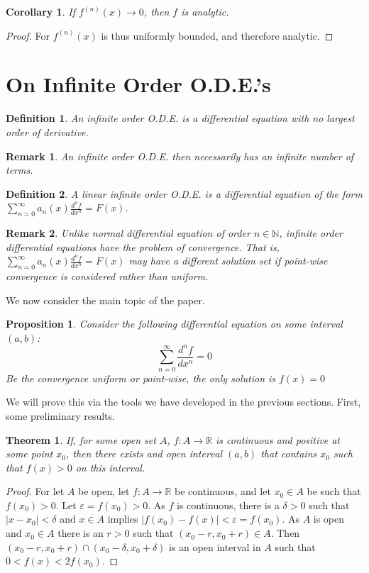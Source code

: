 \documentclass[12pt,oneside]{book}
\theoremstyle{mystyle}
\newtheorem{theorem}{Theorem}[section]
\newtheorem{definition}{Definition}[section]
\newtheorem{corollary}{Corollary}[section]
\newtheorem{proposition}{Proposition}[section]
\newtheorem{remark}{Remark}[section]
\begin{document}
\begin{corollary}
If $f^{(n)}(x)\rightarrow 0$, then $f$ is analytic.
\end{corollary}
\begin{proof}
For $f^{(n)}(x)$ is thus uniformly bounded, and therefore analytic.
\end{proof}
%
\section{On Infinite Order O.D.E.'s}
%
\begin{definition}
An infinite order O.D.E. is a differential equation with no largest order of derivative.
\end{definition}
%
\begin{remark}
An infinite order O.D.E. then necessarily has an infinite number of terms.
\end{remark}

\begin{definition}
A linear infinite order O.D.E. is a differential equation of the form $\sum_{n=0}^{\infty} a_n(x) \frac{d^n f}{dx^n} = F(x)$.
\end{definition}

\begin{remark}
Unlike normal differential equation of order $n\in \mathbb{N}$, infinite order differential equations have the problem of convergence. That is, $\sum_{n=0}^{\infty} a_n(x) \frac{d^n f}{dx^n} = F(x)$ may have a different solution set if point-wise convergence is considered rather than uniform.
\end{remark}

We now consider the main topic of the paper.

\begin{proposition}
Consider the following differential equation on some interval $(a,b)$:
\begin{equation}
\nonumber \sum_{n=0}^{\infty} \frac{d^n f}{dx^n} = 0
\end{equation}
Be the convergence uniform or point-wise, the only solution is $f(x)=0$
\end{proposition}

We will prove this via the tools we have developed in the previous sections. First, some preliminary results.

\begin{theorem}
If, for some open set $A$, $f:A\rightarrow \mathbb{R}$ is continuous and positive at some point $x_0$, then there exists and open interval $(a,b)$ that contains $x_0$ such that $f(x)>0$ on this interval.
\end{theorem}
\begin{proof}
For let $A$ be open, let $f:A\rightarrow \mathbb{R}$ be continuous, and let $x_0\in A$ be such that $f(x_0)>0$. Let $\varepsilon = f(x_0)>0$. As $f$ is continuous, there is a $\delta>0$ such that $|x-x_0|<\delta$ and $x\in A$ implies $|f(x_0)-f(x)|<\varepsilon = f(x_0)$. As $A$ is open and $x_0\in A$ there is an $r>0$ such that $(x_0-r,x_0+r)\in A$. Then $(x_0-r,x_0+r)\cap (x_0-\delta,x_0+\delta)$ is an open interval in $A$ such that $0<f(x)<2f(x_0)$.
\end{proof}
\end{document}
